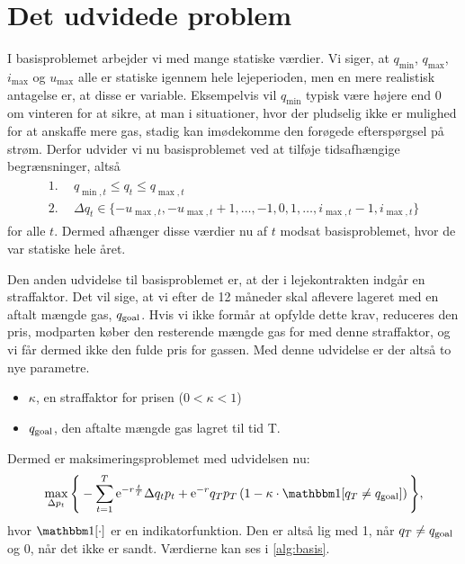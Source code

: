 \section{Det udvidede problem} \label{kap:udvidet_problem}

I basisproblemet arbejder vi med mange statiske værdier. Vi siger, at $q_{\min}$, $q_{\max}$, $i_{\max}$ og $u_{\max}$ alle er statiske igennem hele lejeperioden, men en mere realistisk antagelse er, at disse er variable. Eksempelvis vil $q_{\min}$ typisk være højere end 0 om vinteren for at sikre, at man i situationer, hvor der pludselig ikke er mulighed for at anskaffe mere gas, stadig kan imødekomme den forøgede efterspørgsel på strøm. Derfor udvider vi nu basisproblemet ved at tilføje tidsafhængige begrænsninger, altså
\begin{align}
\begin{split}
\textrm{1.}& \ \ q_{\min,t} \leq q_{t} \leq q_{\max,t} \\
\textrm{2.}& \ \ \Delta q_{t} \in \{-u_{\max,t}, -u_{\max,t} + 1, \dotsc, -1, 0, 1, \dotsc, i_{\max,t} -1, i_{\max,t} \}
\end{split}
\end{align}
for alle $t$. Dermed afhænger disse værdier nu af $t$ modsat basisproblemet, hvor de var statiske hele året. 

Den anden udvidelse til basisproblemet er, at der i lejekontrakten indgår en straffaktor. Det vil sige, at vi efter de 12 måneder skal aflevere lageret med en aftalt mængde gas, $q_{\textrm{goal}}$. Hvis vi ikke formår at opfylde dette krav, reduceres den pris, modparten køber den resterende mængde gas for med denne straffaktor, og vi får dermed ikke den fulde pris for gassen. Med denne udvidelse er der altså to nye parametre.
\begin{itemize}
\item $\kappa$, en straffaktor for prisen ($0 < \kappa < 1$)
\item $q_{\textrm{goal}}$, den aftalte mængde gas lagret til tid T.
\end{itemize}
Dermed er maksimeringsproblemet med udvidelsen nu:
\begin{equation}
\max_{\Delta p_{t}} \Bigg\{ -\sum_{t=1}^{T} \mathrm{e}^{-r\frac{t}{T}} \Delta q_{t} p_{t}+ \mathrm{e}^{-r}q_{T}p_{T} \left (1- \kappa \cdot \ind [q_{T} \neq q_{\goal}] \right )  \Bigg\}, 
\end{equation}
hvor $\ind [\cdot]$ er en indikatorfunktion. Den er altså lig med 1, når $q_{T} \neq q_{\textrm{goal}}$ og 0, når det ikke er sandt. Værdierne kan ses i \autoref{alg:basis}.